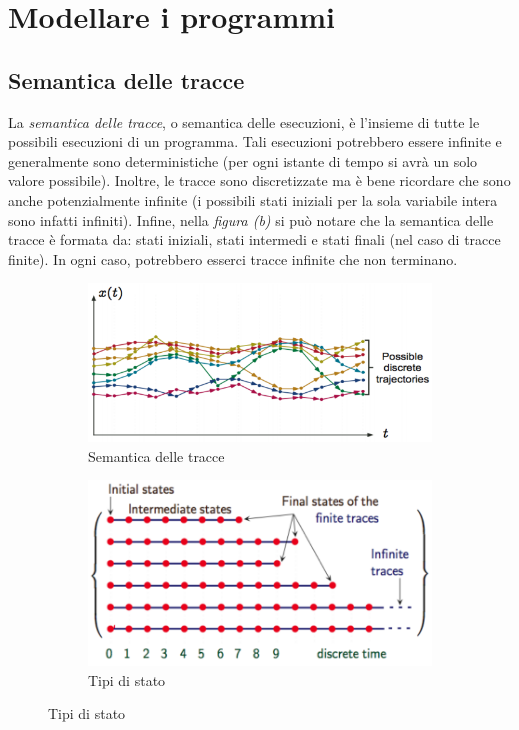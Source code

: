 \documentclass[a4paper,oneside,titlepage]{book}
\begin{document}
\chapter{Modellare i programmi}

\section{Semantica delle tracce} %
La \textit{semantica delle tracce}, o semantica delle esecuzioni, è l'insieme di tutte le possibili esecuzioni di un programma. Tali esecuzioni potrebbero essere infinite e generalmente sono deterministiche (per ogni istante di tempo si avrà un solo valore possibile). Inoltre, le tracce sono discretizzate ma è bene ricordare che sono anche potenzialmente infinite (i possibili stati iniziali per la sola variabile intera sono infatti infiniti). Infine, nella \textit{figura (b)} si può notare che la semantica delle tracce è formata da: stati iniziali, stati intermedi e stati finali (nel caso di tracce finite). In ogni caso, potrebbero esserci tracce infinite che non terminano.
\begin{figure}[htp]
	\begin{subfigure}{0.49\textwidth}
	    \centering
		\includegraphics[width=\textwidth, height=\textheight, keepaspectratio]{semTracce1.png}
		\caption{Semantica delle tracce}
	\end{subfigure}
	\hfill
	\begin{subfigure}{0.49\textwidth}
	    \centering
		\includegraphics[width=\textwidth, height=\textheight, keepaspectratio]{semTracce2.png}
		\caption{Tipi di stato}
	\end{subfigure}
\end{figure}
\end{document}
